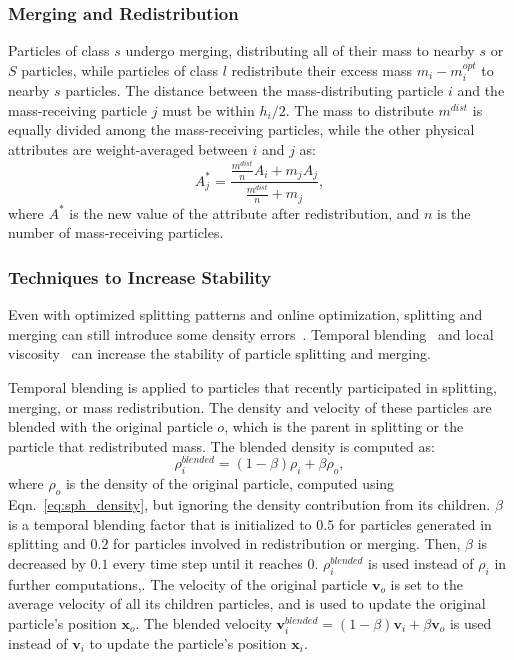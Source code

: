 \documentclass[VANCOUVER,STIX1COL]{WileyNJD-v2}
\begin{document}
\subsubsection{Merging and Redistribution}
\label{sec:merge}
Particles of class $s$ undergo merging, distributing all of their mass to nearby $s$ or $S$ particles, while particles of class $l$ redistribute their excess mass $m_i - m_i^{opt}$ to nearby $s$ particles. The distance between the mass-distributing particle $i$ and the mass-receiving particle $j$ must be within $h_i / 2$. The mass to distribute $m^{dist}$ is equally divided among the mass-receiving particles, while the other physical attributes are weight-averaged between $i$ and $j$ as:
\begin{equation}
    A_j^* = \frac{\frac{m^{dist}}{n}A_i + m_j A_j}{\frac{m^{dist}}{n} + m_j},
\end{equation}
where $A^*$ is the new value of the attribute after redistribution, and $n$ is the number of mass-receiving particles.

\subsubsection{Techniques to Increase Stability}
Even with optimized splitting patterns and online optimization, splitting and merging can still introduce some density errors~\cite{Winchenbach21}. Temporal blending~\cite{Winchenbach17} and local viscosity~\cite{Winchenbach21} can increase the stability of particle splitting and merging.

Temporal blending is applied to particles that recently participated in splitting, merging, or mass redistribution. The density and velocity of these particles are blended with the original particle $o$, which is the parent in splitting or the particle that redistributed mass. The blended density is computed as:
\begin{equation}
    \rho_i^{blended} = (1 - \beta) \rho_i + \beta \rho_o,
\end{equation}
where $\rho_o$ is the density of the original particle, computed using Eqn.~\ref{eq:sph_density}, but ignoring the density contribution from its children. $\beta$ is a temporal blending factor that is initialized to $0.5$ for particles generated in splitting and $0.2$ for particles involved in redistribution or merging.  Then, $\beta$ is decreased by $0.1$ every time step until it reaches $0$. $\rho_i^{blended}$ is used instead of $\rho_i$ in further computations,.
The velocity of the original particle $\mathbf{v}_o$ is set to the average velocity of all its children particles, and is used to update the original particle's position $\mathbf{x}_o$. The blended velocity $\mathbf{v}_i^{blended} = (1 - \beta) \mathbf{v}_i + \beta \mathbf{v}_o$ is used instead of $\mathbf{v}_i$ to update the particle's position $\mathbf{x}_i$.
\end{document}
